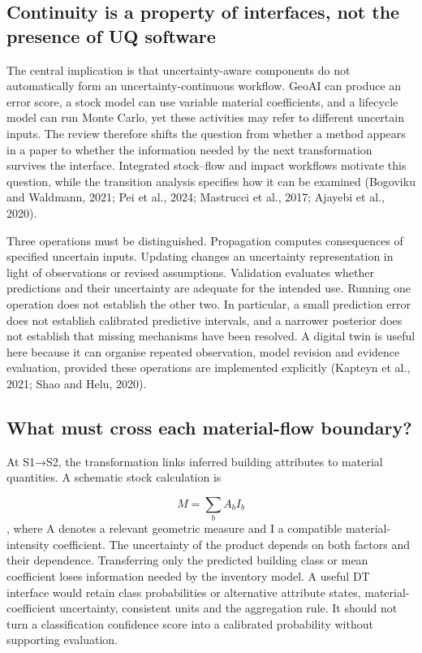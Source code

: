\subsection{Continuity is a property of interfaces, not the presence of UQ software}
The central implication is that uncertainty-aware components do not automatically form an uncertainty-continuous workflow. GeoAI can produce an error score, a stock model can use variable material coefficients, and a lifecycle model can run Monte Carlo, yet these activities may refer to different uncertain inputs. The review therefore shifts the question from whether a method appears in a paper to whether the information needed by the next transformation survives the interface. Integrated stock–flow and impact workflows motivate this question, while the transition analysis specifies how it can be examined (Bogoviku and Waldmann, 2021; Pei et al., 2024; Mastrucci et al., 2017; Ajayebi et al., 2020).

Three operations must be distinguished. Propagation computes consequences of specified uncertain inputs. Updating changes an uncertainty representation in light of observations or revised assumptions. Validation evaluates whether predictions and their uncertainty are adequate for the intended use. Running one operation does not establish the other two. In particular, a small prediction error does not establish calibrated predictive intervals, and a narrower posterior does not establish that missing mechanisms have been resolved. A digital twin is useful here because it can organise repeated observation, model revision and evidence evaluation, provided these operations are implemented explicitly (Kapteyn et al., 2021; Shao and Helu, 2020).


\subsection{What must cross each material-flow boundary?}
At S1→S2, the transformation links inferred building attributes to material quantities. A schematic stock calculation is 

\[
M=\sum_b A_b I_b
\]
, where A denotes a relevant geometric measure and I a compatible material-intensity coefficient. The uncertainty of the product depends on both factors and their dependence. Transferring only the predicted building class or mean coefficient loses information needed by the inventory model. A useful DT interface would retain class probabilities or alternative attribute states, material-coefficient uncertainty, consistent units and the aggregation rule. It should not turn a classification confidence score into a calibrated probability without supporting evaluation.

